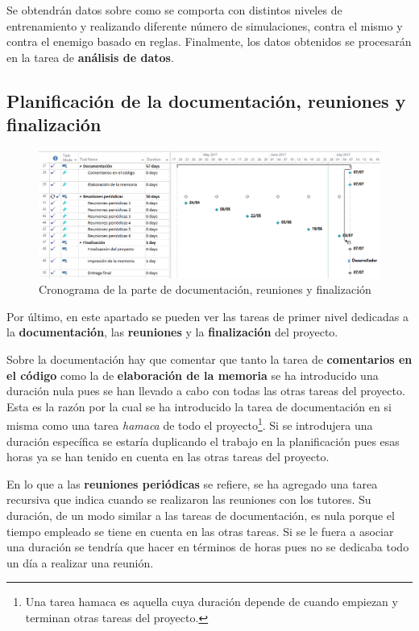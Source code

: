 \bigskip

Se obtendrán datos sobre como se comporta con distintos niveles de entrenamiento y realizando diferente número de simulaciones, contra el mismo y contra el enemigo basado en reglas. Finalmente, los datos obtenidos se procesarán en la tarea de \textbf{análisis de datos}.


\subsection{Planificación de la documentación, reuniones y finalización}

\begin{figure}
	\centerline{\includegraphics[width=17cm]{otros/capturasPlanificacion/documentacion_reuniones_final.PNG}}
	\caption{Cronograma de la parte de documentación, reuniones y finalización}
	\label{plan:fin}
\end{figure}

Por último, en este apartado se pueden ver las tareas de primer nivel dedicadas a la \textbf{documentación}, las \textbf{reuniones} y la \textbf{finalización} del proyecto.

\bigskip

Sobre la documentación hay que comentar que tanto la tarea de \textbf{comentarios en el código} como la de \textbf{elaboración de la memoria} se ha introducido una duración nula pues se han llevado a cabo con todas las otras tareas del proyecto. Esta es la razón por la cual se ha introducido la tarea de documentación en si misma como una tarea \textit{hamaca} de todo el proyecto\footnote{Una tarea hamaca es aquella cuya duración depende de cuando empiezan y terminan otras tareas del proyecto.}. Si se introdujera una duración específica se estaría duplicando el trabajo en la planificación pues esas horas ya se han tenido en cuenta en las otras tareas del proyecto.

\bigskip

En lo que a las \textbf{reuniones periódicas} se refiere, se ha agregado una tarea recursiva que indica cuando se realizaron las reuniones con los tutores. Su duración, de un modo similar a las tareas de documentación, es nula porque el tiempo empleado se tiene en cuenta en las otras tareas. Si se le fuera a asociar una duración se tendría que hacer en términos de horas pues no se dedicaba todo un día a realizar una reunión.

